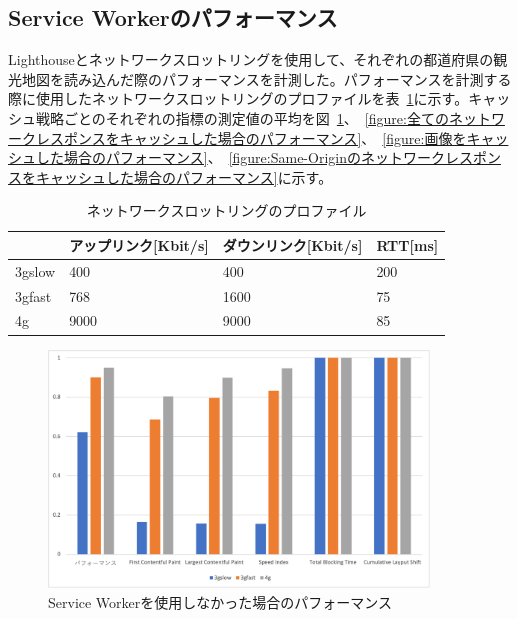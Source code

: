 \subsection{Service Workerのパフォーマンス}\label{subsubsection:Service Workerのパフォーマンス}
Lighthouseとネットワークスロットリングを使用して、それぞれの都道府県の観光地図を読み込んだ際のパフォーマンスを計測した。パフォーマンスを計測する際に使用したネットワークスロットリングのプロファイルを表~\ref{table:ネットワークスロットリングのプロファイル}に示す。キャッシュ戦略ごとのそれぞれの指標の測定値の平均を図~\ref{figure:Service Workerを使用しなかった場合のパフォーマンス}、~\ref{figure:全てのネットワークレスポンスをキャッシュした場合のパフォーマンス}、~\ref{figure:画像をキャッシュした場合のパフォーマンス}、~\ref{figure:Same-Originのネットワークレスポンスをキャッシュした場合のパフォーマンス}に示す。

\begin{table}
  \caption{ネットワークスロットリングのプロファイル}\label{table:ネットワークスロットリングのプロファイル}
  \centering
  \begin{tabular}{|p{5em}|p{10em}|p{10em}|p{10em}|}
    \hline
    & アップリンク[Kbit/s] & ダウンリンク[Kbit/s] & RTT[ms] \\ \hline
    3gslow & 400 & 400 & 200 \\ \hline
    3gfast & 768 & 1600 & 75 \\ \hline
    4g & 9000 & 9000 & 85 \\ \hline
  \end{tabular}
\end{table}

\begin{figure}
  \centering
  \includegraphics[width=0.9\textwidth]{images/without_service_worker.png}
  \caption{Service Workerを使用しなかった場合のパフォーマンス}\label{figure:Service Workerを使用しなかった場合のパフォーマンス}
\end{figure}

